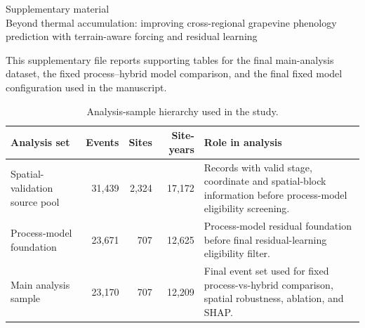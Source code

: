\documentclass[10pt]{article}
\begin{document}
\begin{center}
{\Large Supplementary material}\\[4pt]
{\normalsize Beyond thermal accumulation: improving cross-regional grapevine phenology prediction with terrain-aware forcing and residual learning}
\end{center}

This supplementary file reports supporting tables for the final main-analysis dataset, the fixed process--hybrid model comparison, and the final fixed model configuration used in the manuscript.

\begin{table}[!htbp]
\centering
\caption{Analysis-sample hierarchy used in the study.}
\label{tab:supp_sample_hierarchy}
\small
\begin{tabularx}{\textwidth}{lrrrY}
\toprule
Analysis set & Events & Sites & Site-years & Role in analysis \\
\midrule
Spatial-validation source pool & 31,439 & 2,324 & 17,172 & Records with valid stage, coordinate and spatial-block information before process-model eligibility screening. \\
Process-model foundation & 23,671 & 707 & 12,625 & Process-model residual foundation before final residual-learning eligibility filter. \\
Main analysis sample & 23,170 & 707 & 12,209 & Final event set used for fixed process-vs-hybrid comparison, spatial robustness, ablation, and SHAP. \\
\bottomrule
\end{tabularx}
\end{table}
\end{document}
